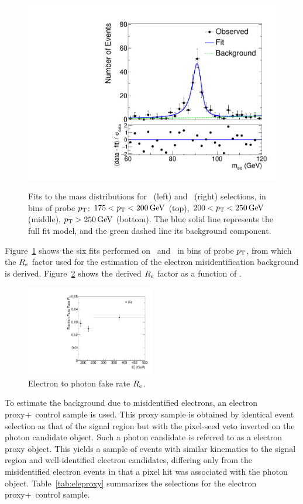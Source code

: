 \begin{figure}[htbp]
{    \includegraphics[]{Analysis/Figures/efake/fit_data_eg_pt_250_6500.pdf}
  }
  \caption{
      Fits to the mass distributions for \Pe\Pe\ (left) and \Pe\Pgg\ (right) selections, in bins of probe $p_{\mathrm{T}}$: $175 < p_{\mathrm{T}} < 200\,\text{Ge\hspace{-.08em}V}$ (top), $200 < p_{\mathrm{T}} < 250\,\text{Ge\hspace{-.08em}V}$ (middle), $p_{\mathrm{T}} > 250\,\text{Ge\hspace{-.08em}V}$ (bottom). 
      The blue solid line represents the full fit model, and the green dashed line its background component.
    }
    \label{fig:efake_fits}
\end{figure}

Figure~\ref{fig:efake_fits} shows the six fits performed on \Pe\Pe\ and \Pe\Pgg\ in bins of probe $p_{\mathrm{T}}$, from which the $R_{{e}}$ factor used for the estimation of the electron misidentification background is derived.
Figure~\ref{fig:efake_frate} shows the derived $R_{{e}}$ factor as a function of \ETg.

\begin{figure}[htbp]
\centering
    \includegraphics[width=0.5\textwidth]{Analysis/Figures/efake/frate_data_ptalt.pdf} 
    \caption{
      Electron to photon fake rate $R_{{e}}$.
    }
    \label{fig:efake_frate}
\end{figure}

To estimate the background due to misidentified electrons, an electron proxy+\met\ control sample is used.
This proxy sample is obtained by identical event selection as that of the signal region but with the pixel-seed veto inverted on the photon candidate object.
Such a photon candidate is referred to as a electron proxy object.
This yields a sample of events with similar kinematics to the signal region and well-identified electron candidates, differing only from the misidentified electron events in that a pixel hit was associated with the photon object.
Table~\ref{tab:eleproxy} summarizes the selections for the electron proxy+\met\ control sample. 

